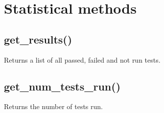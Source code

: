 \documentclass[letterpaper,10pt,english]{sphinxmanual}
\begin{document}
\section{Statistical methods}
\label{\detokenize{api:statistical-methods}}

\subsection{get\_results()}
\label{\detokenize{api:get-results}}
\sphinxAtStartPar
Returns a list of all passed, failed and not run tests.

\begin{sphinxVerbatim}[commandchars=\\\{\}]
\end{sphinxVerbatim}

\sphinxAtStartPar
{}

\begin{sphinxVerbatim}[commandchars=\\\{\}]
  

  \PYG{p}{[}\PYG{p}{]}
  \PYG{p}{[}\PYG{p}{]}
\end{sphinxVerbatim}

\begin{sphinxVerbatim}[commandchars=\\\{\}]
   
\end{sphinxVerbatim}


\subsection{get\_num\_tests\_run()}
\label{\detokenize{api:get-num-tests-run}}
\sphinxAtStartPar
Returns the number of tests run.

\begin{sphinxVerbatim}[commandchars=\\\{\}]
\end{sphinxVerbatim}
\end{document}
